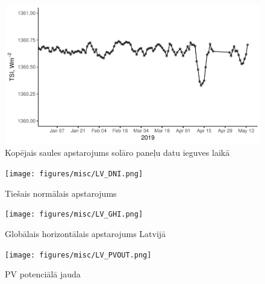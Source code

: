 \begin{figure}[h]
    \centering
    \includegraphics[width=\linewidth]{figures/misc/TSI.pdf}
    \caption{Kopējais saules apstarojums solāro paneļu datu ieguves laikā \cite{TSIdata}}
    \label{fig:TSI2}
\end{figure}

\begin{figure}[h]
    \centering
    \texttt{[image: figures/misc/LV\_DNI.png]}
    \caption{Tiešais normālais apstarojums \cite{solargis}}
    \label{fig:lv_DNI}
\end{figure}
\begin{figure}[h]
    \centering
    \texttt{[image: figures/misc/LV\_GHI.png]}
    \caption{Globālais horizontālais apstarojums Latvijā \cite{solargis}}
    \label{fig:lv_GHI}
\end{figure}
\begin{figure}[h]
    \centering
    \texttt{[image: figures/misc/LV\_PVOUT.png]}
    \caption{PV potenciālā jauda \cite{solargis}}
    \label{fig:lv_PVOUT}
\end{figure}
